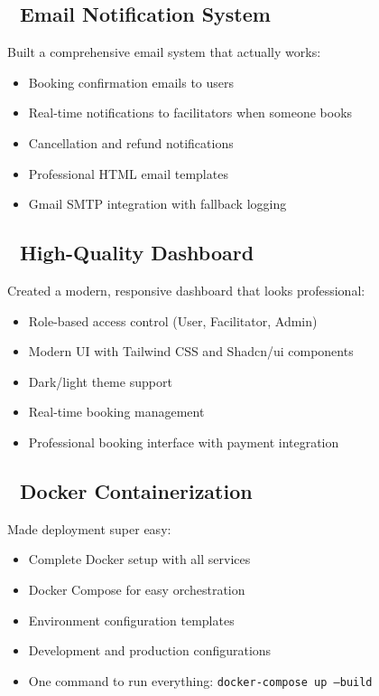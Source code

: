 \documentclass[12pt,a4paper]{article}
\begin{document}
\subsection{📧 Email Notification System}
Built a comprehensive email system that actually works:
\begin{itemize}
    \item Booking confirmation emails to users
    \item Real-time notifications to facilitators when someone books
    \item Cancellation and refund notifications
    \item Professional HTML email templates
    \item Gmail SMTP integration with fallback logging
\end{itemize}

\subsection{🎨 High-Quality Dashboard}
Created a modern, responsive dashboard that looks professional:
\begin{itemize}
    \item Role-based access control (User, Facilitator, Admin)
    \item Modern UI with Tailwind CSS and Shadcn/ui components
    \item Dark/light theme support
    \item Real-time booking management
    \item Professional booking interface with payment integration
\end{itemize}

\subsection{🐳 Docker Containerization}
Made deployment super easy:
\begin{itemize}
    \item Complete Docker setup with all services
    \item Docker Compose for easy orchestration
    \item Environment configuration templates
    \item Development and production configurations
    \item One command to run everything: \texttt{docker-compose up --build}
\end{itemize}
\end{document}
